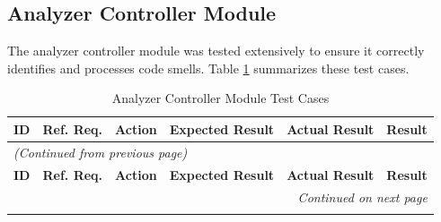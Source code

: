\documentclass[12pt, titlepage]{article}
\begin{document}
\subsection{Analyzer Controller Module}
The analyzer controller module was tested extensively to ensure it correctly identifies and processes code smells. Table \ref{table:analyzer_controller_tests} summarizes these test cases.

\begin{longtable}{c
    >{\raggedright\arraybackslash}p{1.5cm}
    >{\raggedright\arraybackslash}p{4.5cm}
    >{\raggedright\arraybackslash}p{4cm}
  >{\raggedright\arraybackslash}p{3cm} c}
  \toprule
  \textbf{ID} & \textbf{Ref. Req.} & \textbf{Action} &
  \textbf{Expected Result} & \textbf{Actual Result} & \textbf{Result} \\
  \midrule
  \endfirsthead

  \multicolumn{6}{l}{\textit{(Continued from previous page)}} \\
  \toprule
  \textbf{ID} & \textbf{Ref. Req.} & \textbf{Action} &
  \textbf{Expected Result} & \textbf{Actual Result} & \textbf{Result} \\
  \midrule
  \endhead

  \multicolumn{6}{r}{\textit{Continued on next page}} \\
  \endfoot

  \bottomrule
  \caption{Analyzer Controller Module Test Cases}
  \label{table:analyzer_controller_tests}
  \endlastfoot


\end{longtable}
\end{document}

